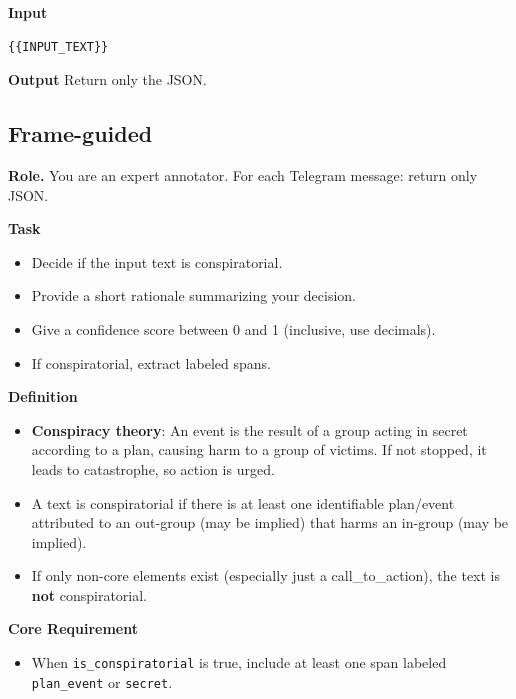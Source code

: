 \vspace{0.5em}
\textbf{Input}
\begin{lstlisting}[style=verbatimstyle]
{{INPUT_TEXT}}
\end{lstlisting}

\vspace{0.5em}
\textbf{Output}
Return only the JSON.


\subsection{Frame-guided}
\small

\textbf{Role.} You are an expert annotator. For each Telegram message: return only JSON.

\vspace{0.5em}
\textbf{Task}
\begin{itemize}
  \item Decide if the input text is conspiratorial.
  \item Provide a short rationale summarizing your decision.
  \item Give a confidence score between 0 and 1 (inclusive, use decimals).
  \item If conspiratorial, extract labeled spans.
\end{itemize}

\vspace{0.5em}
\textbf{Definition}
\begin{itemize}
  \item \textbf{Conspiracy theory}: An event is the result of a group acting in secret according to a plan, causing harm to a group of victims. If not stopped, it leads to catastrophe, so action is urged.
  \item A text is conspiratorial if there is at least one identifiable plan/event attributed to an out-group (may be implied) that harms an in-group (may be implied).
  \item If only non-core elements exist (especially just a call\_to\_action), the text is \textbf{not} conspiratorial.
\end{itemize}

\vspace{0.5em}
\textbf{Core Requirement}
\begin{itemize}
  \item When \texttt{is\_conspiratorial} is true, include at least one span labeled \texttt{plan\_event} or \texttt{secret}.
\end{itemize}

